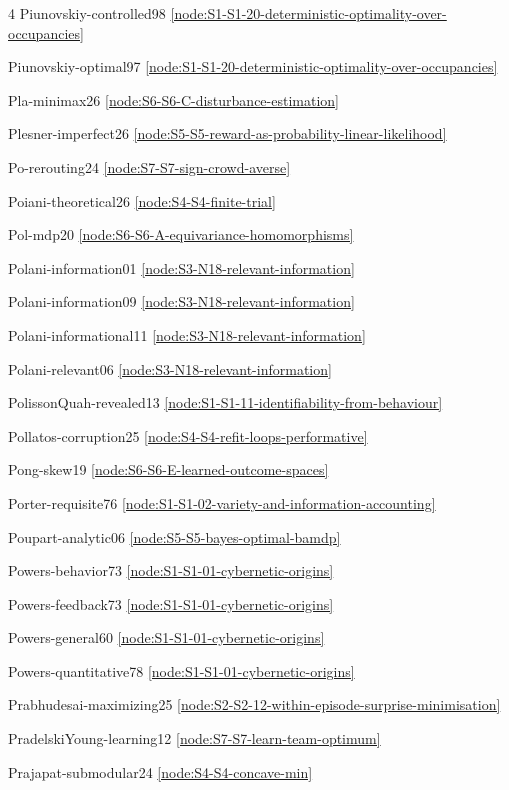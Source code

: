 \documentclass[10pt]{article}
\begin{document}
{\begin{multicols}{4}
Piunovskiy-controlled98 \hfill \ref{node:S1-S1-20-deterministic-optimality-over-occupancies}\par
Piunovskiy-optimal97 \hfill \ref{node:S1-S1-20-deterministic-optimality-over-occupancies}\par
Pla-minimax26 \hfill \ref{node:S6-S6-C-disturbance-estimation}\par
Plesner-imperfect26 \hfill \ref{node:S5-S5-reward-as-probability-linear-likelihood}\par
Po-rerouting24 \hfill \ref{node:S7-S7-sign-crowd-averse}\par
Poiani-theoretical26 \hfill \ref{node:S4-S4-finite-trial}\par
Pol-mdp20 \hfill \ref{node:S6-S6-A-equivariance-homomorphisms}\par
Polani-information01 \hfill \ref{node:S3-N18-relevant-information}\par
Polani-information09 \hfill \ref{node:S3-N18-relevant-information}\par
Polani-informational11 \hfill \ref{node:S3-N18-relevant-information}\par
Polani-relevant06 \hfill \ref{node:S3-N18-relevant-information}\par
PolissonQuah-revealed13 \hfill \ref{node:S1-S1-11-identifiability-from-behaviour}\par
Pollatos-corruption25 \hfill \ref{node:S4-S4-refit-loops-performative}\par
Pong-skew19 \hfill \ref{node:S6-S6-E-learned-outcome-spaces}\par
Porter-requisite76 \hfill \ref{node:S1-S1-02-variety-and-information-accounting}\par
Poupart-analytic06 \hfill \ref{node:S5-S5-bayes-optimal-bamdp}\par
Powers-behavior73 \hfill \ref{node:S1-S1-01-cybernetic-origins}\par
Powers-feedback73 \hfill \ref{node:S1-S1-01-cybernetic-origins}\par
Powers-general60 \hfill \ref{node:S1-S1-01-cybernetic-origins}\par
Powers-quantitative78 \hfill \ref{node:S1-S1-01-cybernetic-origins}\par
Prabhudesai-maximizing25 \hfill \ref{node:S2-S2-12-within-episode-surprise-minimisation}\par
PradelskiYoung-learning12 \hfill \ref{node:S7-S7-learn-team-optimum}\par
Prajapat-submodular24 \hfill \ref{node:S4-S4-concave-min}\par

\end{multicols}}
\end{document}
